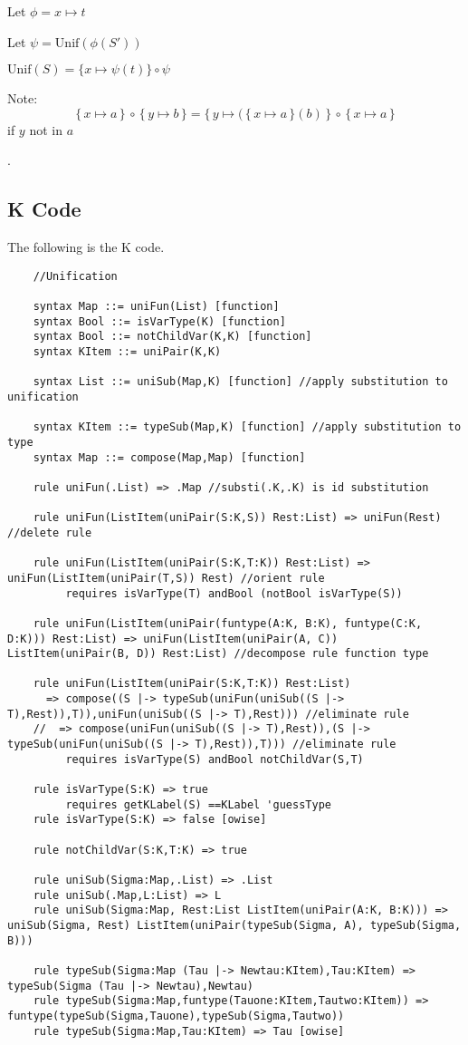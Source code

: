 Let $\phi = x \mapsto t$

Let $\psi = \text{Unif}(\phi(S'))$

$\text{Unif}(S) = \{x \mapsto \psi(t) \} \circ \psi$

Note: $$\{\, x \mapsto a \, \} \, \circ \, \{ \, y \mapsto b\,\} =
\{ \, y \mapsto (\,\{ \, x \mapsto a \, \} (b) \, \} \, \circ \, \{ \, x \mapsto a \, \}$$ if $y$ not
in $a$

\cite{CS421:Unif}.

\subsection{K Code}

The following is the K code.
\begin{lstlisting}
    //Unification

    syntax Map ::= uniFun(List) [function]
    syntax Bool ::= isVarType(K) [function]
    syntax Bool ::= notChildVar(K,K) [function]
    syntax KItem ::= uniPair(K,K)

    syntax List ::= uniSub(Map,K) [function] //apply substitution to unification

    syntax KItem ::= typeSub(Map,K) [function] //apply substitution to type
    syntax Map ::= compose(Map,Map) [function]

    rule uniFun(.List) => .Map //substi(.K,.K) is id substitution

    rule uniFun(ListItem(uniPair(S:K,S)) Rest:List) => uniFun(Rest)  //delete rule

    rule uniFun(ListItem(uniPair(S:K,T:K)) Rest:List) => uniFun(ListItem(uniPair(T,S)) Rest) //orient rule
         requires isVarType(T) andBool (notBool isVarType(S))

    rule uniFun(ListItem(uniPair(funtype(A:K, B:K), funtype(C:K, D:K))) Rest:List) => uniFun(ListItem(uniPair(A, C)) ListItem(uniPair(B, D)) Rest:List) //decompose rule function type

    rule uniFun(ListItem(uniPair(S:K,T:K)) Rest:List) 
      => compose((S |-> typeSub(uniFun(uniSub((S |-> T),Rest)),T)),uniFun(uniSub((S |-> T),Rest))) //eliminate rule
    //  => compose(uniFun(uniSub((S |-> T),Rest)),(S |-> typeSub(uniFun(uniSub((S |-> T),Rest)),T))) //eliminate rule
         requires isVarType(S) andBool notChildVar(S,T)

    rule isVarType(S:K) => true
         requires getKLabel(S) ==KLabel 'guessType
    rule isVarType(S:K) => false [owise]

    rule notChildVar(S:K,T:K) => true

    rule uniSub(Sigma:Map,.List) => .List
    rule uniSub(.Map,L:List) => L
    rule uniSub(Sigma:Map, Rest:List ListItem(uniPair(A:K, B:K))) => uniSub(Sigma, Rest) ListItem(uniPair(typeSub(Sigma, A), typeSub(Sigma, B)))

    rule typeSub(Sigma:Map (Tau |-> Newtau:KItem),Tau:KItem) => typeSub(Sigma (Tau |-> Newtau),Newtau)
    rule typeSub(Sigma:Map,funtype(Tauone:KItem,Tautwo:KItem)) => funtype(typeSub(Sigma,Tauone),typeSub(Sigma,Tautwo))
    rule typeSub(Sigma:Map,Tau:KItem) => Tau [owise]
\end{lstlisting}
